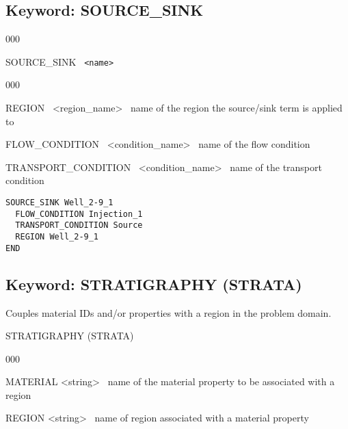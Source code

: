 \subsection{Keyword: SOURCE\_SINK}
\begin{deflist}{000}
\item[SOURCE\_SINK] \ {\tt <name>}
\begin{deflist}{000}
\item[REGION] \ <region\_name> \ name of the region the source/sink term is applied to
\item[FLOW\_CONDITION] \ <condition\_name> \ name of the flow condition
\item[TRANSPORT\_CONDITION] \ <condition\_name> \ name of the transport condition
\end{deflist}
\item[\keyend]
\end{deflist}

\begin{mdframed}

\begin{verbatim}
SOURCE_SINK Well_2-9_1
  FLOW_CONDITION Injection_1
  TRANSPORT_CONDITION Source
  REGION Well_2-9_1
END
\end{verbatim}

\end{mdframed}

\hyperlink{target_key}{\return}


\newpage
\protect\hypertarget{target_strata}{}

\subsection{Keyword: STRATIGRAPHY (STRATA)}

Couples material IDs and/or properties with a region in the problem domain.

\begin{deflist}{00}
\item[STRATIGRAPHY (STRATA)] ~
\begin{deflist}{000}
\item[MATERIAL] <string> \ name of the material property to be associated with a region
\item[REGION] <string> \ name of region associated with a material property
\end{deflist}
\item[\keyend]
\end{deflist}

